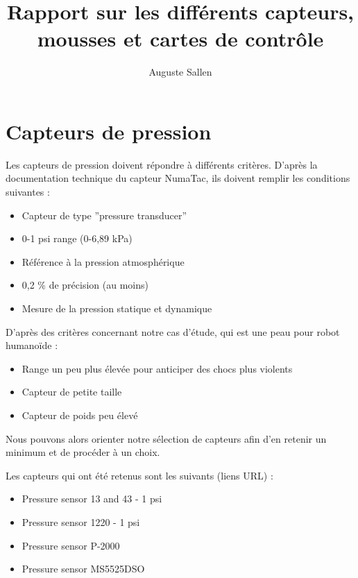 \documentclass[11pt]{report}
\begin{document}
\title{Rapport sur les différents capteurs, mousses et cartes de contrôle}
\author{Auguste Sallen}
\date{}
\maketitle

\section{Capteurs de pression}

Les capteurs de pression doivent répondre à différents critères. D'après la 
documentation technique du capteur NumaTac, ils doivent remplir les conditions suivantes :

\begin{itemize}
  
  \item{Capteur de type ''pressure transducer''}
  
  \item{0-1 psi range (0-6,89 kPa)}
  
  \item{Référence à la pression atmosphérique}
  
  \item{0,2 \% de précision (au moins)}
  
  \item{Mesure de la pression statique et dynamique}
  
\end{itemize}

D'après des critères concernant notre cas d'étude, qui est une peau pour robot humanoïde :

\begin{itemize}
  
  \item{Range un peu plus élevée pour anticiper des chocs plus violents}
  
  \item{Capteur de petite taille}
  
  \item{Capteur de poids peu élevé}
  
\end{itemize}

Nous pouvons alors orienter notre sélection de capteurs afin d'en retenir un 
minimum et de procéder à un choix.

Les capteurs qui ont été retenus sont les suivants (liens URL) :

\begin{itemize}
  
  \item{Pressure sensor 13 and 43 - 1 psi}
  
  \item{Pressure sensor 1220 - 1 psi}
  
  \item{Pressure sensor P-2000}
  
  \item{Pressure sensor MS5525DSO}
  
\end{itemize}
\end{document}
